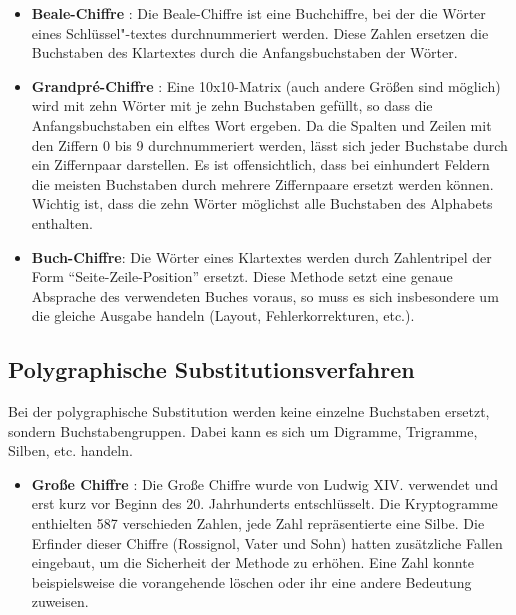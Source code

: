 \begin{refsegment}
\begin{itemize}
\item \textbf{Beale-Chiffre} \cite{Singh2001}:
   Die Beale-Chiffre ist eine Buchchiffre, bei der die Wörter eines
   Schlüssel"-textes durchnummeriert werden. Diese Zahlen ersetzen die
   Buchstaben des Klartextes durch die Anfangsbuchstaben der Wörter.

\item \textbf{Grandpr\'e-Chiffre} \cite{Savard1999}:
   Eine 10x10-Matrix (auch andere Größen sind möglich) wird mit zehn Wörter
   mit je zehn Buchstaben gefüllt, so dass die Anfangsbuchstaben ein elftes
   Wort ergeben. Da die Spalten und Zeilen mit den Ziffern 0 bis 9
   durchnummeriert werden, lässt sich jeder Buchstabe durch ein Ziffernpaar
   darstellen. Es ist offensichtlich, dass bei einhundert Feldern die meisten
   Buchstaben durch mehrere Ziffernpaare ersetzt werden können. Wichtig ist,
   dass die zehn Wörter möglichst alle Buchstaben des Alphabets enthalten.

\item \textbf{Buch-Chiffre}:
   Die Wörter eines Klartextes werden durch Zahlentripel der Form
   "`Seite-Zeile-Position"' ersetzt. Diese Methode setzt eine genaue
   Absprache des verwendeten Buches voraus, so muss es sich insbesondere um
   die gleiche Ausgabe handeln (Layout, Fehlerkorrekturen, etc.).

\end{itemize}



\subsection{Polygraphische Substitutionsverfahren}
\label{polygraphicSubstitutionCiphers}

Bei der polygraphische Substitution werden
keine einzelne Buchstaben ersetzt, sondern Buchstabengruppen. Dabei kann es
sich um Digramme, Trigramme, Silben, etc. handeln.

\begin{itemize}

\item \textbf{Große Chiffre} \cite{Singh2001}:
   Die Große Chiffre wurde von Ludwig XIV. verwendet und erst kurz vor
   Beginn des 20. Jahrhunderts entschlüsselt. Die Kryptogramme enthielten 587
   verschieden Zahlen, jede Zahl repräsentierte eine Silbe. Die Erfinder
   dieser Chiffre (Rossignol, Vater und Sohn) hatten zusätzliche Fallen
   eingebaut, um die Sicherheit der Methode zu erhöhen. Eine Zahl konnte
   beispielsweise die vorangehende löschen oder ihr eine andere Bedeutung
   zuweisen.


\end{itemize}
\end{refsegment}

